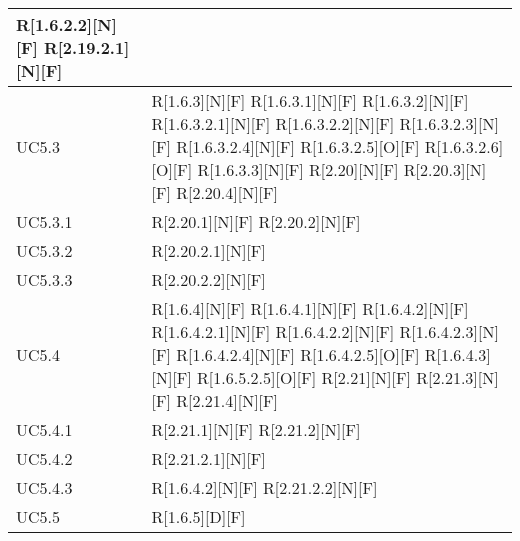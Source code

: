 \begin{longtable}{X | X}
R[1.6.2.2][N][F] \newline
R[2.19.2.1][N][F]  \\
\hline
UC5.3 & R[1.6.3][N][F] \newline
R[1.6.3.1][N][F] \newline
R[1.6.3.2][N][F] \newline
R[1.6.3.2.1][N][F] \newline
R[1.6.3.2.2][N][F] \newline
R[1.6.3.2.3][N][F] \newline
R[1.6.3.2.4][N][F] \newline
R[1.6.3.2.5][O][F] \newline
R[1.6.3.2.6][O][F] \newline
R[1.6.3.3][N][F] \newline
R[2.20][N][F] \newline
R[2.20.3][N][F] \newline
R[2.20.4][N][F]  \\
\hline
UC5.3.1 & R[2.20.1][N][F] \newline
R[2.20.2][N][F]  \\
\hline
UC5.3.2 & R[2.20.2.1][N][F]  \\
\hline
UC5.3.3 & R[2.20.2.2][N][F]  \\
\hline
UC5.4 & R[1.6.4][N][F] \newline
R[1.6.4.1][N][F] \newline
R[1.6.4.2][N][F] \newline
R[1.6.4.2.1][N][F] \newline
R[1.6.4.2.2][N][F] \newline
R[1.6.4.2.3][N][F] \newline
R[1.6.4.2.4][N][F] \newline
R[1.6.4.2.5][O][F] \newline
R[1.6.4.3][N][F] \newline
R[1.6.5.2.5][O][F] \newline
R[2.21][N][F] \newline
R[2.21.3][N][F] \newline
R[2.21.4][N][F]  \\
\hline
UC5.4.1 & R[2.21.1][N][F] \newline
R[2.21.2][N][F]  \\
\hline
UC5.4.2 & R[2.21.2.1][N][F]  \\
\hline
UC5.4.3 & R[1.6.4.2][N][F] \newline
R[2.21.2.2][N][F]  \\
\hline
UC5.5 & R[1.6.5][D][F] \newline

\end{longtable}
